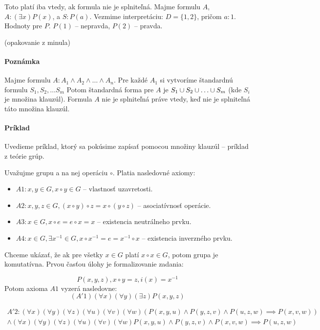 \startFIXME
\par Toto platí iba vtedy, ak formula nie je splniteľná. Majme formulu $A$, $A:
(\exists x) P(x)$, a $S: P(a)$. Vezmime interpretáciu: $D = \{1, 2 \}$, pričom
$a: 1$. Hodnoty pre $P$. $P(1)$ -- nepravda, $P(2)$ -- pravda.

(opakovanie z minula) 

\paragraph{Poznámka} Majme formulu $A: A_1 \land A_2 \land \ldots \land A_n$.
Pre každé $A_1$ si vytvoríme štandardnú formulu $S_1, S_2, \ldots S_m$ Potom
štandardná forma pre $A$ je $S_1 \cup S_2 \cup \ldots \cup S_m$ (kde $S_i$
je množina klauzúl). Formula $A$ nie je splniteľná práve vtedy, keď nie je
splniteľná táto množina klauzúl.

\paragraph{Príklad} Uvedieme príklad, ktorý sa pokúsime zapísať pomocou množiny
klauzúl -- príklad z teórie grúp. 

\par Uvažujme grupu a na nej operáciu $\circ$. Platia nasledovné axiomy:
\begin{itemize}
\item $A1: x, y \in G, x \circ y \in G$ -- vlastnosť uzavretosti.
\item $A2: x, y, z \in G, (x \circ y) \circ z = x \circ (y \circ z)$ -- asociatívnosť
operácie.
\item $A3: x \in G, x \circ e = e \circ x = x$ -- existencia neutrálneho prvku.
\item $A4: x \in G, \exists x^{-1} \in G, x \circ x^{-1} = e = x^{-1} \circ x$ --
existencia inverzného prvku.
\end{itemize}
Chceme ukázať, že ak pre všetky $x \in G$ platí $x \circ x \in G$, potom grupa
je komutatívna. Prvou časťou úlohy je formalizovanie zadania:

$$ P(x,y,z), x \circ y = z, i(x) = x^{-1}$$
Potom axioma $A1$ vyzerá nasledovne:
$$(A'1) (\forall x) (\forall y) (\exists z) P(x,y,z)$$


$$ 
\begin{array}{l}
A'2:(\forall x) (\forall y) (\forall z) (\forall u) (\forall v) (\forall w) (P(x,y,u) \land  P(y,z,v)
\land P(u, z, w) \implies  
P(x,v,w)) \\ \land (\forall x) (\forall y)(\forall z)
(\forall u)(\forall v) (\forall w)
P(x,y,u) \land P(y,z,v) \land P(x,v,w) \implies P(u,z,w)
\end{array}
$$


